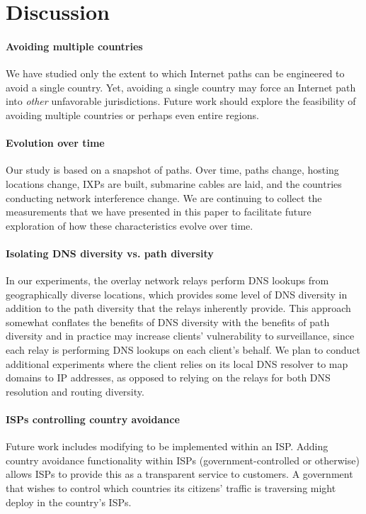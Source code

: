 \section{Discussion}
\label{sec:discussion}

\paragraph{Avoiding multiple countries} 
We have studied only the extent to which Internet paths can be
engineered to avoid a {single} country.  Yet, avoiding a single country
may force an Internet path into {\em other} unfavorable
jurisdictions. Future work should
explore the feasibility of avoiding multiple countries or perhaps even entire regions.


\paragraph{Evolution over time}
Our study is based on a snapshot of paths. Over time, paths
change, hosting locations change, IXPs are built, submarine cables are
laid, and the countries conducting network interference change.  We are continuing to collect
the measurements that we have presented in this paper to facilitate future exploration
of how these characteristics evolve over time.

\paragraph{Isolating DNS diversity vs. path diversity}
In our experiments, the overlay network relays perform DNS lookups from
geographically diverse locations, which provides some level of DNS
diversity in addition to the path diversity that the relays inherently
provide. This approach somewhat conflates the benefits of DNS diversity
with the benefits of path diversity and in practice may increase
clients' vulnerability to surveillance, since each relay is performing
DNS lookups on each client's behalf. We plan to conduct additional
experiments where the client relies on its local DNS resolver to map
domains to IP addresses, as opposed to relying on the relays for both
DNS resolution and routing diversity.

\paragraph{ISPs controlling country avoidance} 
Future work includes modifying \system{} to be implemented within an 
ISP.  Adding country avoidance functionality within ISPs 
(government-controlled or otherwise) allows ISPs to provide this as a transparent
service to customers.  A government that wishes to control which countries
its citizens' traffic is traversing might deploy \system{} in the country's ISPs.

